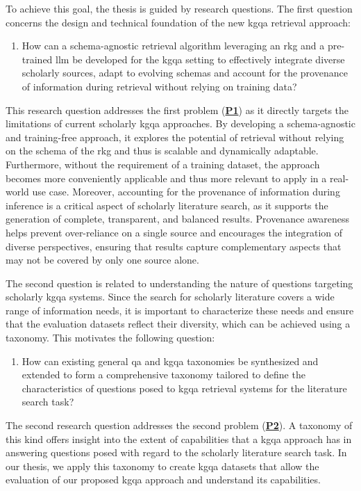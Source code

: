 To achieve this goal, the thesis is guided by research questions. The first question concerns the design and technical foundation of the new \gls{kgqa} retrieval approach:

\begin{enumerate}[label=\textbf{RQ\arabic*}, leftmargin=2.5em]
    \label{enum:rq1}
    \item How can a schema-agnostic retrieval algorithm leveraging an \gls{rkg} and a pre-trained \gls{llm} be developed for the \gls{kgqa} setting to effectively integrate diverse scholarly sources, adapt to evolving schemas and account for the provenance of information during retrieval without relying on training data?
\end{enumerate}

This research question addresses the first problem (\hyperref[sec:problem_statements]{\textbf{P1}}) as it directly targets the limitations of current scholarly \gls{kgqa} approaches. By developing a schema-agnostic and training-free approach, it explores the potential of retrieval without relying on the schema of the \gls{rkg} and thus is scalable and dynamically adaptable. Furthermore, without the requirement of a training dataset, the approach becomes more conveniently applicable and thus more relevant to apply in a real-world use case. Moreover, accounting for the provenance of information during inference is a critical aspect of scholarly literature search, as it supports the generation of complete, transparent, and balanced results. Provenance awareness helps prevent over-reliance on a single source and encourages the integration of diverse perspectives, ensuring that results capture complementary aspects that may not be covered by only one source alone.

The second question is related to understanding the nature of questions targeting scholarly \gls{kgqa} systems. Since the search for scholarly literature covers a wide range of information needs, it is important to characterize these needs and ensure that the evaluation datasets reflect their diversity, which can be achieved using a taxonomy. This motivates the following question:

\begin{enumerate}[label=\textbf{RQ\arabic*}, leftmargin=2.5em, start=2]
    \label{enum:rq2}
    \item How can existing general \gls{qa} and \gls{kgqa} taxonomies be synthesized and extended to form a comprehensive taxonomy tailored to define the characteristics of questions posed to \gls{kgqa} retrieval systems for the literature search task?
\end{enumerate}

The second research question addresses the second problem (\hyperref[sec:problem_statements]{\textbf{P2}}). A taxonomy of this kind offers insight into the extent of capabilities that a \gls{kgqa} approach has in answering questions posed with regard to the scholarly literature search task. In our thesis, we apply this taxonomy to create \gls{kgqa} datasets that allow the evaluation of our proposed \gls{kgqa} approach and understand its capabilities.
